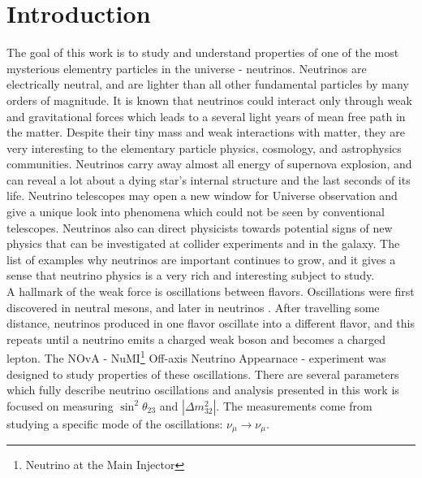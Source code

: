 \chapter{Introduction}
\label{intro_chapter}

The goal of this work is to study and understand properties of one of the most 
mysterious elementry particles in the universe - neutrinos. Neutrinos are electrically
neutral, and are lighter than all other fundamental particles by many orders of magnitude.
It is known that neutrinos could interact only through weak and 
gravitational forces which leads to a several light years of mean free path in 
the matter. Despite their tiny mass and weak interactions
with matter, they are very interesting to the elementary particle physics, cosmology, and
astrophysics communities. Neutrinos carry away almost all energy of supernova 
explosion, and can reveal a lot about a dying star's internal structure and the last 
seconds of its life. Neutrino telescopes may open a new window for Universe observation 
and give a unique look into phenomena which could not be seen by conventional 
telescopes. Neutrinos also can direct physicists
towards potential signs of new physics that can be investigated at collider experiments
\cite{seeSawAndParityViolation} and in the galaxy. The list of examples why neutrinos are 
important continues to grow, and it gives a sense that neutrino physics is a 
very rich and interesting subject to study.\\

A hallmark of the weak force is oscillations between flavors.  Oscillations were first
discovered in neutral mesons, and later in neutrinos \cite{kamiokandeTwo, solarNuSummary,
dayaBayResults, NOvAresults, mainzPhaseIIResults, t2kResults}. After travelling some
distance, neutrinos produced in one flavor oscillate into a different flavor, and this repeats
until a neutrino emits a charged weak boson and becomes a charged lepton. The NOvA - 
NuMI\footnote{Neutrino at the Main Injector} Off-axis Neutrino Appearnace - experiment
was designed to study properties of these oscillations. There are several
parameters which fully describe neutrino oscillations and analysis presented in this work 
is focused on measuring $\sin^2\theta_{23}$ and $|\Delta m^2_{32}|$. The measurements 
come from studying a specific mode of the oscillations: $\nu_\mu \rightarrow \nu_\mu$.\\

